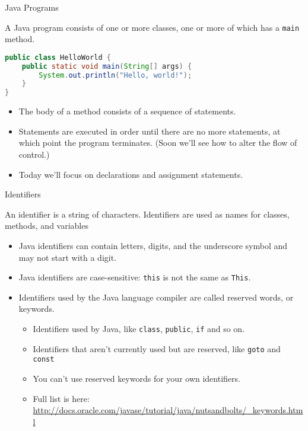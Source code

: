 \documentclass{beamer}
\author[Chris Simpkins] 
{Christopher Simpkins \\\texttt{chris.simpkins@gatech.edu}}
\institute[Georgia Tech] %
\date{}
\begin{document}
\begin{frame}
  \titlepage
\end{frame}

\begin{frame}[fragile]{Java Programs}


A Java program consists of one or more classes, one or more of which has a {\tt main} method.
\begin{lstlisting}[language=Java]
public class HelloWorld {
    public static void main(String[] args) {
        System.out.println("Hello, world!");
    }
}
\end{lstlisting}
\begin{itemize}
\item The body of a method consists of a sequence of statements.
\item Statements are executed in order until there are no more statements, at which point the program terminates. (Soon we'll see how to alter the flow of control.)
\item Today we'll focus on declarations and assignment statements.
\end{itemize}

\end{frame}

\begin{frame}[fragile]{Identifiers}


An identifier is a string of characters.  Identifiers are used as names for classes, methods, and variables
\begin{itemize}
\item Java identifiers can contain letters, digits, and the underscore symbol and may not start with a digit.
\item Java identifiers are case-sensitive:  {\tt this} is not the same as {\tt This}.
\item Identifiers used by the Java language compiler are called reserved words, or keywords.  
\begin{itemize}
\item Identifiers used by Java, like {\tt class}, {\tt public}, {\tt if} and so on.
\item Identifiers that aren't currently used but are reserved, like {\tt goto} and {\tt const}
\item You can't use reserved keywords for your own identifiers.
\item Full list is here: \url{http://docs.oracle.com/javase/tutorial/java/nutsandbolts/_keywords.html}
\end{itemize}

\end{itemize}


\end{frame}
\end{document}
